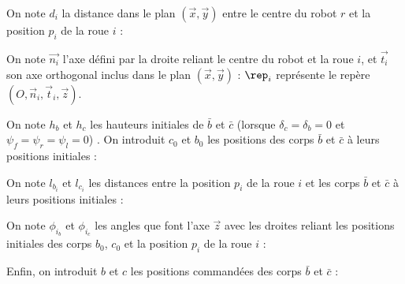 					On note $d_i$ la distance dans le plan $(\vec{x}, \vec{y})$ entre le centre du robot $r$ et la position $p_i$ de la roue $i$ :
					
					On note  $\vec{n_i}$ l'axe défini par la droite reliant le centre du robot et la roue $i$, et $\vec{t_i}$ son axe orthogonal inclus dans le plan $(\vec{x}, \vec{y})$ :
					$\rep_i$ représente le repère $(O, \vec{n}_i, \vec{t}_i, \vec{z})$.
					
					On note $h_b$ et $h_c$ les hauteurs initiales de $\bar{b}$ et $\bar{c}$ (lorsque $\delta_c=\delta_b=0$ et $\psi_f=\psi_r=\psi_l=0$) .
					On introduit $c_0$ et $b_0$ les positions des corps $\bar{b}$ et $\bar{c}$ à leurs positions initiales :
					
					On note $l_{b_i}$ et $l_{c_i}$ les distances entre la position $p_i$ de la roue $i$ et les corps $\bar{b}$ et $\bar{c}$ à leurs positions initiales :
					
					On note $\phi_{i_b}$ et $\phi_{i_c}$ les angles que font l'axe $\vec{z}$ avec les droites reliant les positions initiales des corps $b_0$, $c_0$ et la position $p_i$ de la roue $i$ :
					
					Enfin, on introduit $b$ et $c$ les positions commandées des corps $\bar{b}$ et $\bar{c}$ :
					
					

